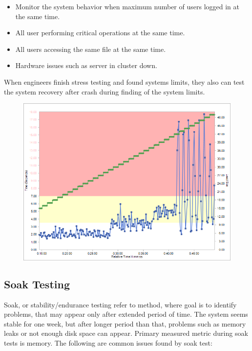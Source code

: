 \begin{itemize}
	\setlength\itemsep{0em}
	\item Monitor the system behavior when maximum number of users logged in at the same time.
	\item All user performing critical operations at the same time.
	\item All users accessing the same file at the same time.
	\item Hardware issues such as server in cluster down.
\end{itemize} 

When engineers finish stress testing and found systems limits, they also can test the system recovery after crash during finding of the system limits.

\begin{figure}[H]
  \centering
  \includegraphics[width=15cm]{obrazky-figures/stress-testing.png}
  \caption{}
  \label{fig:stress_test}
\end{figure}

\subsection*{Soak Testing}
\label{Soak Testing}
Soak, or stability/endurance testing refer to method, where goal is to identify problems, that may appear only after extended period of time. The system seems stable for one week, but after longer period than that, problems such as memory leaks or not enough disk space can appear. Primary measured metric during soak tests is memory. The following are common issues found by soak test:

